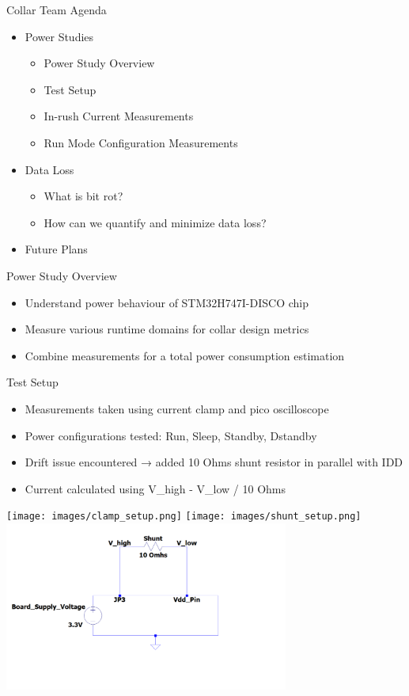 \begin{frame}{Collar Team Agenda}
    \begin{itemize}
        \item Power Studies
        \begin{itemize}
            \item Power Study Overview
            \item Test Setup 
            \item In-rush Current Measurements
            \item Run Mode Configuration Measurements
        \end{itemize}
        \item Data Loss
        \begin{itemize}
            \item What is bit rot?
            \item How can we quantify and minimize data loss?
        \end{itemize}
        \item Future Plans
    \end{itemize}
\end{frame}

\begin{frame}{Power Study Overview}
    \begin{itemize}
        \item Understand power behaviour of STM32H747I-DISCO chip
        \item Measure various runtime domains for collar design metrics
        \item Combine measurements for a total power consumption estimation
    \end{itemize}
\end{frame}

\begin{frame}{Test Setup}
    \begin{itemize}
        \item Measurements taken using current clamp and pico oscilloscope
        \item Power configurations tested: Run, Sleep, Standby, Dstandby
        \item Drift issue encountered → added 10 Ohms shunt resistor in parallel with IDD
        \item Current calculated using V\_high - V\_low / 10 Ohms
    \end{itemize}  
    \texttt{[image: images/clamp\_setup.png]}
    \texttt{[image: images/shunt\_setup.png]}
    \includegraphics[height=0.35\textheight,width=0.7\textwidth,keepaspectratio]{images/shunt.png}
\end{frame}

